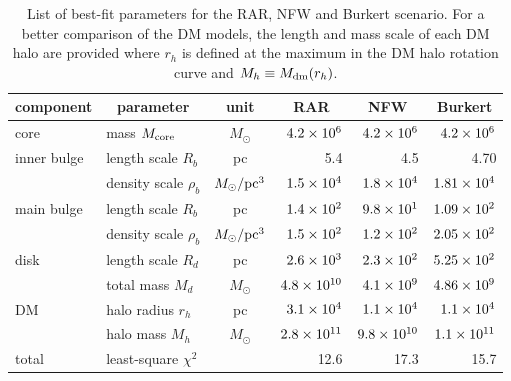 \begin{table*}[tbp]
\centering
\begin{tabularx}{\hsize}{@{\extracolsep{\fill}}llcrrr}
\hline
component   & \multicolumn{1}{c}{parameter} & unit                 & \multicolumn{1}{c}{RAR} & \multicolumn{1}{c}{NFW} & \multicolumn{1}{c}{Burkert} \\
\hline
\hline
core        									& mass $M_{\rm core}$           & $M_\odot$            & $\SI{4.2E6}{}$           & $\SI{4.2E6}{}$           & $\SI{4.2E6}{}$                \\
\hline
\multirow{ 2}{*}{inner bulge} & length scale $R_b$            & pc                   & 5.4                    	& 4.5                    	 & 4.70                        \\
															& density scale $\rho_b$        & $M_\odot/{\rm pc}^3$ & $\SI{1.5E4}{}$           & $\SI{1.8E4}{}$           & $\SI{1.81E4}{}$               \\
\hline
\multirow{ 2}{*}{main bulge}  &    length scale $R_b$         & pc                   & $\SI{1.4E2}{}$           & $\SI{9.8E1}{}$           & $\SI{1.09E2}{}$               \\
															& density scale $\rho_b$        & $M_\odot/{\rm pc}^3$ & $\SI{1.5E2}{}$           & $\SI{1.2E2}{}$           & $\SI{2.05E2}{}$               \\
\hline
\multirow{ 2}{*}{disk} 				& length scale $R_d$            & pc                   & $\SI{2.6E3}{}$           & $\SI{2.3E2}{}$           & $\SI{5.25E2}{}$               \\
															& total mass $M_d$            	& $M_\odot$            & $\SI{4.8E10}{}$          & $\SI{4.1E9}{}$           & $\SI{4.86E9}{}$               \\
\hline
\multirow{ 2}{*}{DM}  				& halo radius $r_h$             & pc                   & $\SI{3.1E4}{}$           & $\SI{1.1E4}{}$           & $\SI{1.1E4}{}$               \\
															& halo mass $M_h$               & $M_\odot$            & $\SI{2.8E11}{}$          & $\SI{9.8E10}{}$          & $\SI{1.1E11}{}$               \\
\hline
\hline
total       									& least-square $\chi^2$         &                      & 12.6                     & 17.3                     & 15.7\\
\hline
\end{tabularx}%
\caption{List of best-fit parameters for the RAR, NFW and Burkert scenario. For a better comparison of the DM models, the length and mass scale of each DM halo are provided where $r_h$ is defined at the maximum in the DM halo rotation curve and $M_h \equiv M_{\rm dm}(r_h)$.}
\label{tbl:sol:param}
\end{table*}